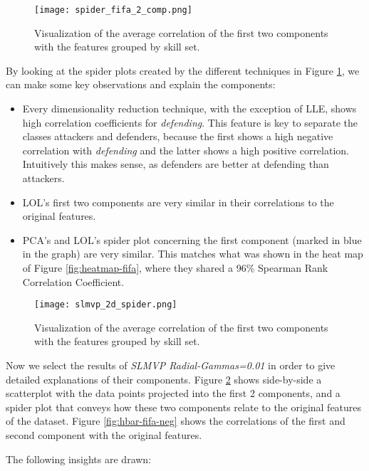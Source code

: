 \begin{figure}[!ht]
    \centering
    \texttt{[image: spider\_fifa\_2\_comp.png]}
    \caption{Visualization of the average correlation of the first two components with the features grouped by skill set.}
    \label{fig:spider_fifa}
\end{figure}

By looking at the spider plots created by the different techniques in Figure \ref{fig:spider_fifa}, we can make some key observations and explain the components:

\begin{itemize}
    \item Every dimensionality reduction technique, with the exception of LLE, shows high correlation coefficients for \textit{defending}. This feature is key to separate the classes attackers and defenders, because the first shows a high negative correlation with \textit{defending} and the latter shows a high positive correlation. Intuitively this makes sense, as defenders are better at defending than attackers.
    \item LOL's first two components are very similar in their correlations to the original features.
    \item PCA's and LOL's spider plot concerning the first component (marked in blue in the graph) are very similar. This matches what was shown in the heat map of Figure \ref{fig:heatmap-fifa}, where they shared a 96\% Spearman Rank Correlation Coefficient.
\end{itemize}

\begin{figure}[!ht]
    \centering
    \texttt{[image: slmvp\_2d\_spider.png]}
    \caption{Visualization of the average correlation of the first two components with the features grouped by skill set.}
    \label{fig:2d_spider_fifa}
\end{figure}

Now we select the results of \textit{SLMVP Radial-Gammas=0.01} in order to give detailed explanations of their components. Figure \ref{fig:2d_spider_fifa} shows side-by-side a scatterplot with the data points projected into the first 2 components, and a spider plot that conveys how these two components relate to the original features of the dataset. Figure \ref{fig:hbar-fifa-neg} shows the correlations of the first and second component with the original features.

The following insights are drawn:

